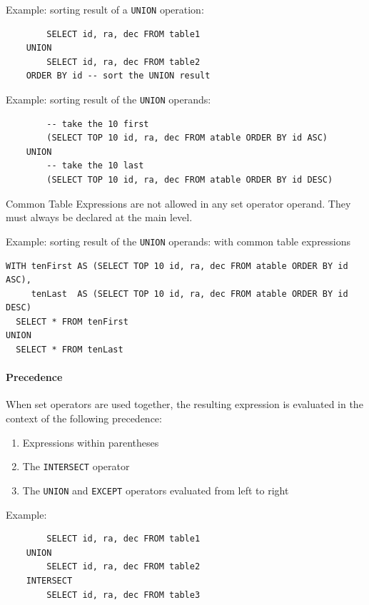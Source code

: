 \documentclass[11pt,a4paper]{ivoa}
\begin{document}
Example: sorting result of a \verb:UNION: operation:

\begin{verbatim}
        SELECT id, ra, dec FROM table1
    UNION
        SELECT id, ra, dec FROM table2
    ORDER BY id -- sort the UNION result
\end{verbatim}

Example: sorting result of the \verb:UNION: operands:

\begin{verbatim}
        -- take the 10 first
        (SELECT TOP 10 id, ra, dec FROM atable ORDER BY id ASC)
    UNION
        -- take the 10 last
        (SELECT TOP 10 id, ra, dec FROM atable ORDER BY id DESC)
\end{verbatim}

Common Table Expressions are not allowed in any set operator operand. They must
always be declared at the main level.

Example: sorting result of the \verb:UNION: operands: with common table
expressions

\begin{verbatim}
WITH tenFirst AS (SELECT TOP 10 id, ra, dec FROM atable ORDER BY id ASC),
     tenLast  AS (SELECT TOP 10 id, ra, dec FROM atable ORDER BY id DESC)
  SELECT * FROM tenFirst
UNION
  SELECT * FROM tenLast
\end{verbatim}

\paragraph{Precedence}

When set operators are used together, the resulting expression is
evaluated in the context of the following precedence:

\begin{enumerate}
    \item Expressions within parentheses
    \item The \verb:INTERSECT: operator
    \item The \verb:UNION: and \verb:EXCEPT: operators evaluated from left to
          right
\end{enumerate}

Example:

\begin{verbatim}
        SELECT id, ra, dec FROM table1
    UNION
        SELECT id, ra, dec FROM table2
    INTERSECT
        SELECT id, ra, dec FROM table3
\end{verbatim}
\end{document}
